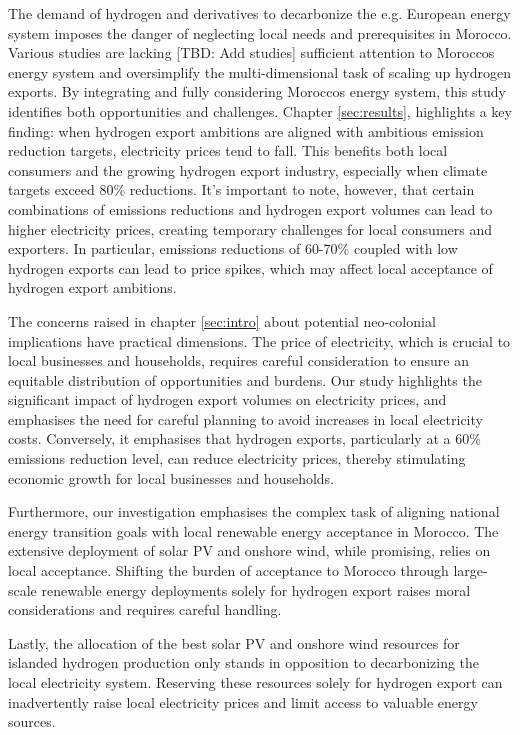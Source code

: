 The demand of hydrogen and derivatives to decarbonize the e.g. European energy system imposes the danger of neglecting local needs and prerequisites in Morocco. Various studies are lacking [TBD: Add studies] sufficient attention to Moroccos energy system and oversimplify the multi-dimensional task of scaling up hydrogen exports. By integrating and fully considering Moroccos energy system, this study identifies both opportunities and challenges. Chapter \ref{sec:results}, highlights a key finding: when hydrogen export ambitions are aligned with ambitious emission reduction targets, electricity prices tend to fall. This benefits both local consumers and the growing hydrogen export industry, especially when climate targets exceed 80\% reductions. It's important to note, however, that certain combinations of emissions reductions and hydrogen export volumes can lead to higher electricity prices, creating temporary challenges for local consumers and exporters. In particular, emissions reductions of 60-70\% coupled with low hydrogen exports can lead to price spikes, which may affect local acceptance of hydrogen export ambitions.

The concerns raised in chapter \ref{sec:intro} about potential neo-colonial implications have practical dimensions. The price of electricity, which is crucial to local businesses and households, requires careful consideration to ensure an equitable distribution of opportunities and burdens. Our study highlights the significant impact of hydrogen export volumes on electricity prices, and emphasises the need for careful planning to avoid increases in local electricity costs. Conversely, it emphasises that hydrogen exports, particularly at a 60\% emissions reduction level, can reduce electricity prices, thereby stimulating economic growth for local businesses and households.

Furthermore, our investigation emphasises the complex task of aligning national energy transition goals with local renewable energy acceptance in Morocco. The extensive deployment of solar PV and onshore wind, while promising, relies on local acceptance. Shifting the burden of acceptance to Morocco through large-scale renewable energy deployments solely for hydrogen export raises moral considerations and requires careful handling.

Lastly, the allocation of the best solar PV and onshore wind resources for islanded hydrogen production only stands in opposition to decarbonizing the local electricity system. Reserving these resources solely for hydrogen export can inadvertently raise local electricity prices and limit access to valuable energy sources.

